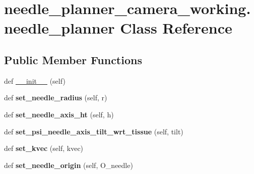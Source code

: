 \hypertarget{classneedle__planner__camera__working_1_1needle__planner}{}\section{needle\+\_\+planner\+\_\+camera\+\_\+working.\+needle\+\_\+planner Class Reference}
\label{classneedle__planner__camera__working_1_1needle__planner}
\subsection*{Public Member Functions}
\begin{DoxyCompactItemize}
\item 
def \hyperlink{classneedle__planner__camera__working_1_1needle__planner_ad41b1dda3a1489f08bfdb903e1e83b93}{\+\_\+\+\_\+init\+\_\+\+\_\+} (self)
\item 
def {\bfseries set\+\_\+needle\+\_\+radius} (self, r)\hypertarget{classneedle__planner__camera__working_1_1needle__planner_a466abefc3db1b4ba8eaeed4947c3ea11}{}\label{classneedle__planner__camera__working_1_1needle__planner_a466abefc3db1b4ba8eaeed4947c3ea11}

\item 
def {\bfseries set\+\_\+needle\+\_\+axis\+\_\+ht} (self, h)\hypertarget{classneedle__planner__camera__working_1_1needle__planner_a19faf22d38a742da359f57ebd614f88d}{}\label{classneedle__planner__camera__working_1_1needle__planner_a19faf22d38a742da359f57ebd614f88d}

\item 
def {\bfseries set\+\_\+psi\+\_\+needle\+\_\+axis\+\_\+tilt\+\_\+wrt\+\_\+tissue} (self, tilt)\hypertarget{classneedle__planner__camera__working_1_1needle__planner_a5b1e0b2f2a068066a3567396f6586f34}{}\label{classneedle__planner__camera__working_1_1needle__planner_a5b1e0b2f2a068066a3567396f6586f34}

\item 
def {\bfseries set\+\_\+kvec} (self, kvec)\hypertarget{classneedle__planner__camera__working_1_1needle__planner_a96d49561b25d5e2238256f15ed6864c2}{}\label{classneedle__planner__camera__working_1_1needle__planner_a96d49561b25d5e2238256f15ed6864c2}

\item 
def {\bfseries set\+\_\+needle\+\_\+origin} (self, O\+\_\+needle)\hypertarget{classneedle__planner__camera__working_1_1needle__planner_af12690073bc30306e80f9ba3270249e4}{}\label{classneedle__planner__camera__working_1_1needle__planner_af12690073bc30306e80f9ba3270249e4}


\end{DoxyCompactItemize}

